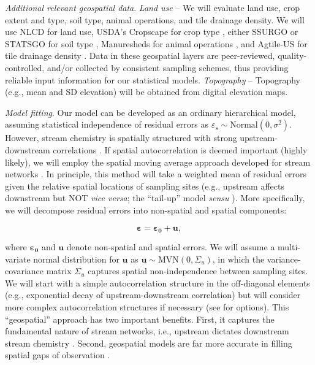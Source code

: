 \documentclass[12pt, class=article, crop=false]{standalone}
\begin{document}
\textit{Additional relevant geospatial data}.
\textit{Land use} -- We will evaluate land use, crop extent and type, soil type, animal operations, and tile drainage density. We will use NLCD for land use, USDA's Cropscape for crop type \citep{han_cropscape_2012}, either SSURGO or STATSGO for soil type \citep{us_department_of_agriculture_soil_2024, us_department_of_agriculture_us_2024}, Manuresheds for animal operations \citep{spiegal_manuresheds_2020}, and Agtile-US for tile drainage density \citep{valayamkunnath_mapping_2020}.
Data in these geospatial layers are peer-reviewed, quality-controlled, and/or collected by consistent sampling schemes, thus providing reliable input information for our statistical models.
\textit{Topography} -- Topography (e.g., mean and SD elevation) will be obtained from digital elevation maps.

\textit{Model fitting}.
Our model can be developed as an ordinary hierarchical model, assuming statistical independence of residual errors as $\varepsilon_s \sim \mbox{Normal}(0, \sigma^2)$.
However, stream chemistry is spatially structured with strong upstream-downstream correlations \citep{peterson_patterns_2006, peterson_modelling_2013}.
If spatial autocorrelation is deemed important (highly likely), we will employ the spatial moving average approach developed for stream networks \citep{ver_hoef_spatial_2006}.
In principle, this method will take a weighted mean of residual errors given the relative spatial locations of sampling sites (e.g., upstream affects downstream but NOT \textit{vice versa}; the ``tail-up'' model \textit{sensu} \citep{peterson_modelling_2013}).
More specifically, we will decompose residual errors into non-spatial and spatial components:

\begin{equation}
\pmb{\varepsilon} = \pmb{\varepsilon_0} + \pmb{u},
\end{equation}

where $\pmb{\varepsilon_0}$ and $\pmb{u}$ denote non-spatial and spatial errors. We will assume a multi-variate normal distribution for $\pmb{u}$ as $\pmb{u} \sim \mbox{MVN}(0, \Sigma_{u})$, in which the variance-covariance matrix $\Sigma_{u}$ captures spatial non-independence between sampling sites.
We will start with a simple autocorrelation structure in the off-diagonal elements (e.g., exponential decay of upstream-downstream correlation) but will consider more complex autocorrelation structures if necessary (see \citep{ver_hoef_spatial_2006} for options).
This ``geospatial'' approach has two important benefits. First, it captures the fundamental nature of stream networks, i.e., upstream dictates downstream stream chemistry \citep{peterson_modelling_2013}.
Second, geospatial models are far more accurate in filling spatial gaps of observation \citep{ver_hoef_spatial_2006, peterson_mixed-model_2010, peterson_modelling_2013}.
\end{document}
